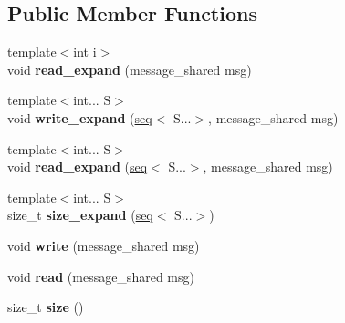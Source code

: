 \subsection*{Public Member Functions}
\begin{DoxyCompactItemize}
\item 
\hypertarget{classgal_1_1network_1_1serial__ext_a3351ca1d29f0996e8e0d53f297bd6d2a}{{\footnotesize template$<$int i$>$ }\\void {\bfseries read\-\_\-expand} (message\-\_\-shared msg)}\label{classgal_1_1network_1_1serial__ext_a3351ca1d29f0996e8e0d53f297bd6d2a}

\item 
\hypertarget{classgal_1_1network_1_1serial__ext_a809b3aaf3e7b230917ecdba03478394f}{{\footnotesize template$<$int... S$>$ }\\void {\bfseries write\-\_\-expand} (\hyperlink{structseq}{seq}$<$ S...$>$, message\-\_\-shared msg)}\label{classgal_1_1network_1_1serial__ext_a809b3aaf3e7b230917ecdba03478394f}

\item 
\hypertarget{classgal_1_1network_1_1serial__ext_a4390bf410c73d1248d570711a7c7b23f}{{\footnotesize template$<$int... S$>$ }\\void {\bfseries read\-\_\-expand} (\hyperlink{structseq}{seq}$<$ S...$>$, message\-\_\-shared msg)}\label{classgal_1_1network_1_1serial__ext_a4390bf410c73d1248d570711a7c7b23f}

\item 
\hypertarget{classgal_1_1network_1_1serial__ext_a28603c0e7dbdb1d1e766ed922889886e}{{\footnotesize template$<$int... S$>$ }\\size\-\_\-t {\bfseries size\-\_\-expand} (\hyperlink{structseq}{seq}$<$ S...$>$)}\label{classgal_1_1network_1_1serial__ext_a28603c0e7dbdb1d1e766ed922889886e}

\item 
\hypertarget{classgal_1_1network_1_1serial__ext_a492710a00e65fa43ded36916dbf1ea28}{void {\bfseries write} (message\-\_\-shared msg)}\label{classgal_1_1network_1_1serial__ext_a492710a00e65fa43ded36916dbf1ea28}

\item 
\hypertarget{classgal_1_1network_1_1serial__ext_a06038a5f1aadd0fe73e966ceeacbc685}{void {\bfseries read} (message\-\_\-shared msg)}\label{classgal_1_1network_1_1serial__ext_a06038a5f1aadd0fe73e966ceeacbc685}

\item 
\hypertarget{classgal_1_1network_1_1serial__ext_a78848aa7718b88c624070e01e583bdec}{size\-\_\-t {\bfseries size} ()}\label{classgal_1_1network_1_1serial__ext_a78848aa7718b88c624070e01e583bdec}

\end{DoxyCompactItemize}
